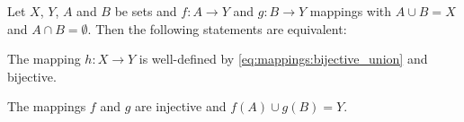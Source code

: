 \begin{corollary}\label{corollary:mappings:bijective_union}
    Let $X$, $Y$, $A$ and $B$ be sets and $f\colon A\rightarrow Y$ and $g\colon B\rightarrow Y$ mappings with $A\cup B=X$ and $A\cap B=\emptyset$. Then the following statements are equivalent:
    \begin{intheoremenumerate}
        \item The mapping $h\colon X\rightarrow Y$ is well-defined by \eqref{eq:mappings:bijective_union} and bijective.
        \item The mappings $f$ and $g$ are injective and $f(A)\cup g(B)=Y$.
    \end{intheoremenumerate}
\end{corollary}

%


